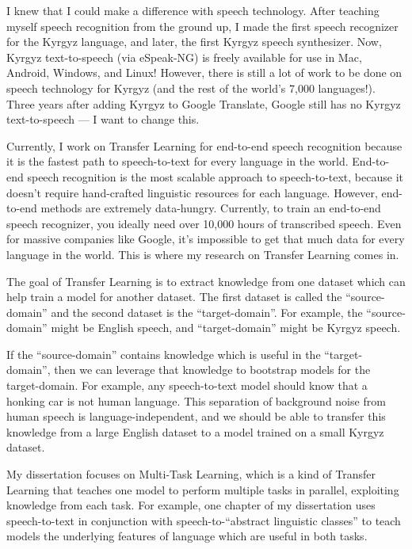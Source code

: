 \documentclass[12pt,a4paper]{article}
\begin{document}
I knew that I could make a difference with speech technology. After teaching myself speech recognition from the ground up, I made the first speech recognizer for the Kyrgyz language, and later, the first Kyrgyz speech synthesizer. Now, Kyrgyz text-to-speech (via eSpeak-NG) is freely available for use in Mac, Android, Windows, and Linux! However, there is still a lot of work to be done on speech technology for Kyrgyz (and the rest of the world's 7,000 languages!). Three years after adding Kyrgyz to Google Translate, Google still has no Kyrgyz text-to-speech --- I want to change this.

Currently, I work on Transfer Learning for end-to-end speech recognition because it is the fastest path to speech-to-text for every language in the world. End-to-end speech recognition is the most scalable approach to speech-to-text, because it doesn't require hand-crafted linguistic resources for each language. However, end-to-end methods are extremely data-hungry. Currently, to train an end-to-end speech recognizer, you ideally need over 10,000 hours of transcribed speech. Even for massive companies like Google, it's impossible to get that much data for every language in the world. This is where my research on Transfer Learning comes in.

The goal of Transfer Learning is to extract knowledge from one dataset which can help train a model for another dataset. The first dataset is called the ``source-domain'' and the second dataset is the ``target-domain''. For example, the ``source-domain'' might be English speech, and ``target-domain'' might be Kyrgyz speech.

If the ``source-domain'' contains knowledge which is useful in the ``target-domain'', then we can leverage that knowledge to bootstrap models for the target-domain. For example, any speech-to-text model should know that a honking car is not human language. This separation of background noise from human speech is language-independent, and we should be able to transfer this knowledge from a large English dataset to a model trained on a small Kyrgyz dataset.

My dissertation focuses on Multi-Task Learning, which is a kind of Transfer Learning that teaches one model to perform multiple tasks in parallel, exploiting knowledge from each task. For example, one chapter of my dissertation uses speech-to-text in conjunction with speech-to-``abstract linguistic classes'' to teach models the underlying features of language which are useful in both tasks.
\end{document}
